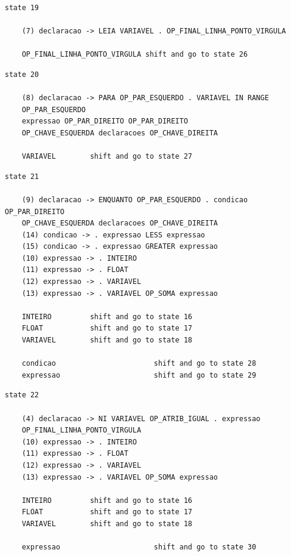 \documentclass[a4paper,12pt]{article}
\begin{document}
\begin{verbatim}
state 19

    (7) declaracao -> LEIA VARIAVEL . OP_FINAL_LINHA_PONTO_VIRGULA

    OP_FINAL_LINHA_PONTO_VIRGULA shift and go to state 26

\end{verbatim}

\begin{verbatim}
state 20

    (8) declaracao -> PARA OP_PAR_ESQUERDO . VARIAVEL IN RANGE 
    OP_PAR_ESQUERDO 
    expressao OP_PAR_DIREITO OP_PAR_DIREITO 
    OP_CHAVE_ESQUERDA declaracoes OP_CHAVE_DIREITA

    VARIAVEL        shift and go to state 27

\end{verbatim}

\begin{verbatim}
state 21

    (9) declaracao -> ENQUANTO OP_PAR_ESQUERDO . condicao OP_PAR_DIREITO 
    OP_CHAVE_ESQUERDA declaracoes OP_CHAVE_DIREITA
    (14) condicao -> . expressao LESS expressao
    (15) condicao -> . expressao GREATER expressao
    (10) expressao -> . INTEIRO
    (11) expressao -> . FLOAT
    (12) expressao -> . VARIAVEL
    (13) expressao -> . VARIAVEL OP_SOMA expressao

    INTEIRO         shift and go to state 16
    FLOAT           shift and go to state 17
    VARIAVEL        shift and go to state 18

    condicao                       shift and go to state 28
    expressao                      shift and go to state 29

\end{verbatim}

\begin{verbatim}
state 22

    (4) declaracao -> NI VARIAVEL OP_ATRIB_IGUAL . expressao 
    OP_FINAL_LINHA_PONTO_VIRGULA
    (10) expressao -> . INTEIRO
    (11) expressao -> . FLOAT
    (12) expressao -> . VARIAVEL
    (13) expressao -> . VARIAVEL OP_SOMA expressao

    INTEIRO         shift and go to state 16
    FLOAT           shift and go to state 17
    VARIAVEL        shift and go to state 18

    expressao                      shift and go to state 30

\end{verbatim}
\end{document}
